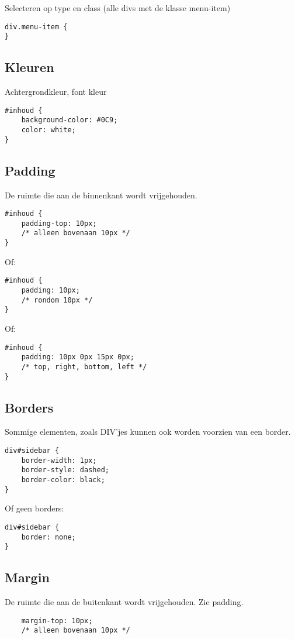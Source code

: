 \documentclass[8pt,pagesize,footinclude=false,headinclude=false]{scrartcl}
\begin{document}
\begin{multicols*}{4}
\noindent Selecteren op type en class (alle divs met de klasse menu-item)
\begin{lstlisting}
div.menu-item {
}
\end{lstlisting}

\subsection*{Kleuren}
Achtergrondkleur, font kleur
\begin{lstlisting}
#inhoud {
	background-color: #0C9;
	color: white;
}
\end{lstlisting}

\subsection*{Padding}
De ruimte die aan de binnenkant wordt vrijgehouden.
\begin{lstlisting}
#inhoud {
	padding-top: 10px; 
	/* alleen bovenaan 10px */
}
\end{lstlisting}
\noindent Of:
\begin{lstlisting}
#inhoud {
	padding: 10px; 
	/* rondom 10px */
}
\end{lstlisting}
\noindent Of:
\begin{lstlisting}
#inhoud {
	padding: 10px 0px 15px 0px; 
	/* top, right, bottom, left */
}
\end{lstlisting}

\subsection*{Borders}
Sommige elementen, zoals DIV'jes kunnen ook worden voorzien van een border.
\begin{lstlisting}
div#sidebar {
	border-width: 1px;
	border-style: dashed;
	border-color: black;
}
\end{lstlisting}

\noindent Of geen borders:

\begin{lstlisting}
div#sidebar {
	border: none;
}
\end{lstlisting}

\subsection*{Margin}
De ruimte die aan de buitenkant wordt vrijgehouden. Zie padding.
\begin{lstlisting}
	margin-top: 10px; 
	/* alleen bovenaan 10px */
	

\end{lstlisting}
\end{multicols*}
\end{document}
